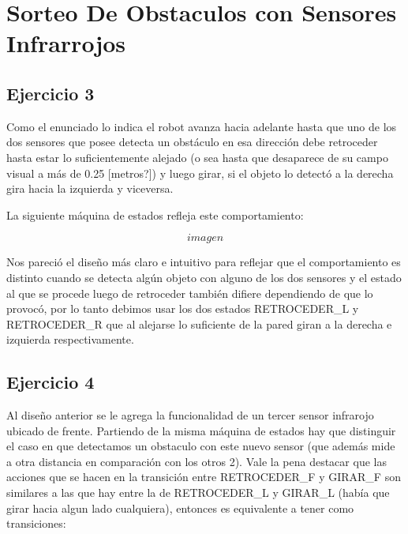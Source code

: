 \section{Sorteo De Obstaculos con Sensores Infrarrojos}

\subsection{Ejercicio 3}



Como el enunciado lo indica el robot avanza hacia adelante hasta que uno de los dos sensores que posee detecta un obstáculo en esa dirección debe retroceder hasta estar lo suficientemente alejado (o sea hasta que desaparece de su campo visual a más de 0.25 [metros?]) y luego girar, si el objeto lo detectó a la derecha gira hacia la izquierda y viceversa.

La siguiente máquina de estados refleja este comportamiento:

$$imagen$$

Nos pareció el diseño más claro e intuitivo para reflejar que el comportamiento es distinto cuando se detecta algún objeto con alguno de los dos sensores y el estado al que se procede luego de retroceder también  difiere dependiendo de que lo provocó, por lo tanto debimos usar los dos estados RETROCEDER\_L y RETROCEDER\_R que al alejarse lo suficiente de la pared giran a la derecha e izquierda respectivamente. 




\subsection{Ejercicio 4}
Al diseño anterior se le agrega la funcionalidad de un tercer sensor infrarojo ubicado de frente. Partiendo de la misma máquina de estados hay que distinguir el caso en que detectamos un obstaculo con este nuevo sensor (que además mide a otra distancia en comparación con los otros 2). Vale la pena destacar que las acciones que se hacen en la transición entre RETROCEDER\_F y GIRAR\_F son similares a las que hay entre la de RETROCEDER\_L y GIRAR\_L (hab\'ia que girar hacia algun lado cualquiera), entonces es equivalente a tener como transiciones:


